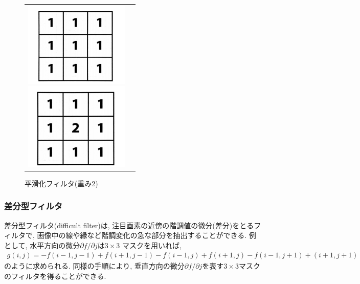 \documentclass[a4paper,11pt,uplatex, titlepage]{jsarticle}
\begin{document}
\begin{figure}[H]
  \begin{tabular}{cc}
    \begin{minipage}{0.5\hsize}
      \begin{center}
      \includegraphics[width = 5cm]{pic/heikatsuka.png}
      \caption{平滑化フィルタ}
      \label{heikatsuka}
      \end{center}
    \end{minipage}

    \begin{minipage}{0.5\hsize}
      \begin{center}
        \includegraphics[width = 5cm]{pic/omomi.png}
        \caption{平滑化フィルタ(重み2)}
        \label{omomi}
      \end{center}
    \end{minipage}
  \end{tabular}
\end{figure}

\subsubsection{差分型フィルタ}
差分型フィルタ(difficult filter)は, 注目画素の近傍の階調値の微分(差分)をとるフィルタで,
画像中の線や縁など階調変化の急な部分を抽出することができる. 例として, 水平方向の微分$\partial f / \partial j$は$3\times3$
マスクを用いれば,
\begin{align}
  g(i,j)=-f(i-1,j-1)+f(i+1,j-1)-f(i-1,j)+f(i+1,j)-f(i-1,j+1)+(i+1,j+1)
\end{align}
のように求められる. 同様の手順により, 垂直方向の微分$\partial f / \partial j$を表す$3\times3$マスクのフィルタを得ることができる.
\end{document}
